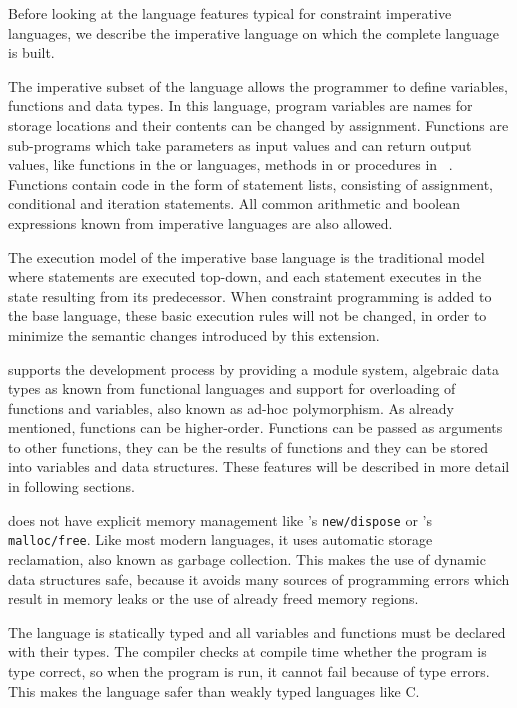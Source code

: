 Before looking at the language features typical for constraint
imperative languages, we describe the imperative language on which the
complete \turtle{} language is built.

The imperative subset of the \turtle{} language allows the programmer
to define variables, functions and data types.  In this language,
program variables are names for storage locations and their contents
can be changed by assignment.  Functions are sub-programs which take
parameters as input values and can return output values, like
functions in the \cee{}
or \cplusplus{}
languages, methods in \java{}
or procedures in \modula{}~\cite{wirth85modula}.  Functions contain
code in the form of statement lists, consisting of assignment,
conditional and iteration statements.  All common arithmetic and
boolean expressions known from imperative languages are also allowed.

The execution model of the imperative base language is the traditional
model where statements are executed top-down, and each statement
executes in the state resulting from its predecessor.  When constraint
programming is added to the base language, these basic execution rules
will not be changed, in order to minimize the semantic changes
introduced by this extension.

\turtle{} supports the development process by providing a module
system, algebraic data types%
 as known from functional languages and
support for overloading of functions and variables, also known as
ad-hoc polymorphism.  As already mentioned, functions can be
higher-order.  Functions can be passed as arguments to other
functions, they can be the results of functions and they can be stored
into variables and data structures.  These features will be described
in more detail in following sections.

\turtle{} does not have explicit memory management like \modula{}'s
{\tt new/dispose} or \cee{}'s {\tt malloc/free}.  Like most modern
languages, it uses automatic storage reclamation, also known as
garbage collection.  This makes the use of dynamic data structures
safe, because it avoids many sources of programming errors which
result in memory leaks or the use of already freed memory regions.

The language is statically typed and all variables and functions must
be declared with their types.  The compiler checks at compile time
whether the program is type correct, so when the program is run, it
cannot fail because of type errors.  This makes the language safer
than weakly typed languages like {\sc C}.

